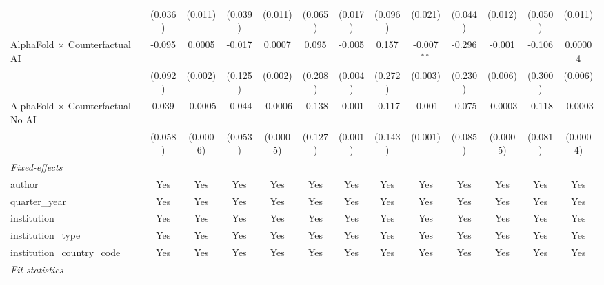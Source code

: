 \begin{tabular}{lcccccccccccc}
                                            & (0.036)      & (0.011)     & (0.039)       & (0.011)     & (0.065) & (0.017) & (0.096) & (0.021)       & (0.044)       & (0.012)     & (0.050)       & (0.011)\\   
   AlphaFold $\times$ Counterfactual AI     & -0.095       & 0.0005      & -0.017        & 0.0007      & 0.095   & -0.005  & 0.157   & -0.007$^{**}$ & -0.296        & -0.001      & -0.106        & 0.00004\\   
                                            & (0.092)      & (0.002)     & (0.125)       & (0.002)     & (0.208) & (0.004) & (0.272) & (0.003)       & (0.230)       & (0.006)     & (0.300)       & (0.006)\\   
   AlphaFold $\times$ Counterfactual No AI  & 0.039        & -0.0005     & -0.044        & -0.0006     & -0.138  & -0.001  & -0.117  & -0.001        & -0.075        & -0.0003     & -0.118        & -0.0003\\   
                                            & (0.058)      & (0.0006)    & (0.053)       & (0.0005)    & (0.127) & (0.001) & (0.143) & (0.001)       & (0.085)       & (0.0005)    & (0.081)       & (0.0004)\\   
   \midrule
   \emph{Fixed-effects}\\
   author                                   & Yes          & Yes         & Yes           & Yes         & Yes     & Yes     & Yes     & Yes           & Yes           & Yes         & Yes           & Yes\\  
   quarter\_year                            & Yes          & Yes         & Yes           & Yes         & Yes     & Yes     & Yes     & Yes           & Yes           & Yes         & Yes           & Yes\\  
   institution                              & Yes          & Yes         & Yes           & Yes         & Yes     & Yes     & Yes     & Yes           & Yes           & Yes         & Yes           & Yes\\  
   institution\_type                        & Yes          & Yes         & Yes           & Yes         & Yes     & Yes     & Yes     & Yes           & Yes           & Yes         & Yes           & Yes\\  
   institution\_country\_code               & Yes          & Yes         & Yes           & Yes         & Yes     & Yes     & Yes     & Yes           & Yes           & Yes         & Yes           & Yes\\  
   \midrule
   \emph{Fit statistics}\\

\end{tabular}
